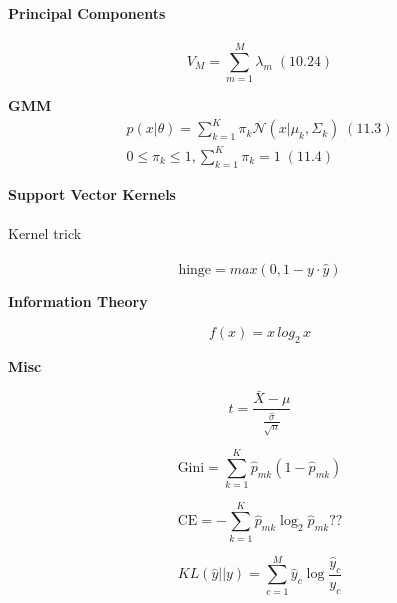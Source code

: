 \documentclass[fleqn,9pt]{article}
\begin{document}
\begin{minipage}[t]{.33333\textwidth}


\textbf{Principal Components}
\\\\

\begin{equation*}
	V_M = \sum_{m=1}^{M}\lambda_m \; (10.24)
\end{equation*}

\textbf{GMM}
\begin{equation*}
\begin{split}
p(x|\theta) = \sum_{k=1}^K \pi_k \mathcal{N}(x|\mu_k,\Sigma_k)\; (11.3)\\
0 \le \pi_k \le 1, \sum_{k=1}^K \pi_k = 1\;(11.4)
\end{split}
\end{equation*}

\textbf{Support Vector Kernels}
\\\\
Kernel trick
\\\\

\begin{equation*}
\text{hinge} = max(0, 1 - y \cdot \hat{y})
\end{equation*}

\textbf{Information Theory}


\begin{equation*}
	f(x) = x\,log_2\,x
\end{equation*}

\textbf{Misc}

\begin{equation*}
	t = \frac{\bar{X} - \mu}{\frac{\hat{\sigma}}{\sqrt{n}}}
\end{equation*}


\begin{equation*}
	\text{Gini} = \sum_{k=1}^{K}\hat{p}_{mk}(1-\hat{p}_{mk})
\end{equation*}

\begin{equation*}
	\text{CE} = -\sum_{k=1}^{K}\hat{p}_{mk}\log _2 \hat{p}_{mk} ??
\end{equation*}

%

\begin{equation*}
KL(\hat{y} || y) = \sum_{c=1}^{M}\hat{y}_c \log{\frac{\hat{y}_c}{y_c}}
\end{equation*}


\end{minipage}
\end{document}
